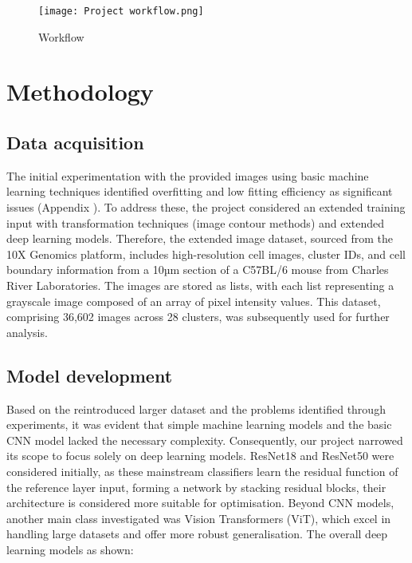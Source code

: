 \documentclass[letterpaper,9pt,twocolumn,twoside,]{pinp}
\begin{document}
\begin{figure}[h]
    \raggedright
    \texttt{[image: Project workflow.png]}
    \caption{Workflow}
    \label{fig:Workflow}
\end{figure}

\hypertarget{methodology}{%
\section{Methodology}\label{methodology}}

\hypertarget{data-acquisition}{%
\subsection{Data acquisition}\label{data-acquisition}}

The initial experimentation with the provided images using basic machine
learning techniques identified overfitting and low fitting efficiency as
significant issues (Appendix ). To address these, the project considered
an extended training input with transformation techniques (image contour
methods) and extended deep learning models. Therefore, the extended
image dataset, sourced from the 10X Genomics platform, includes
high-resolution cell images, cluster IDs, and cell boundary information
from a 10µm section of a C57BL/6 mouse from Charles River Laboratories.
The images are stored as lists, with each list representing a grayscale
image composed of an array of pixel intensity values. This dataset,
comprising 36,602 images across 28 clusters, was subsequently used for
further analysis.

\hypertarget{model-development}{%
\subsection{Model development}\label{model-development}}

Based on the reintroduced larger dataset and the problems identified
through experiments, it was evident that simple machine learning models
and the basic CNN model lacked the necessary complexity. Consequently,
our project narrowed its scope to focus solely on deep learning models.
ResNet18 and ResNet50 were considered initially, as these mainstream
classifiers learn the residual function of the reference layer input,
forming a network by stacking residual blocks, their architecture is
considered more suitable for optimisation. Beyond CNN models, another
main class investigated was Vision Transformers (ViT), which excel in
handling large datasets and offer more robust generalisation. The
overall deep learning models as shown:
\end{document}
